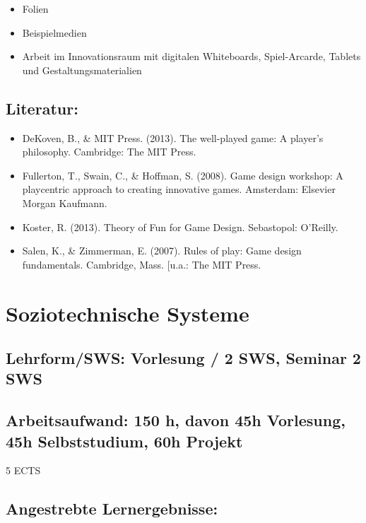 \begin{itemize}
\tightlist
\item
  Folien
\item
  Beispielmedien
\item
  Arbeit im Innovationsraum mit digitalen Whiteboards, Spiel-Arcarde,
  Tablets und Gestaltungsmaterialien
\end{itemize}

\section{Literatur:}\label{literatur-23}

\begin{itemize}
\tightlist
\item
  DeKoven, B., \& MIT Press. (2013). The well-played game: A player's
  philosophy. Cambridge: The MIT Press.
\item
  Fullerton, T., Swain, C., \& Hoffman, S. (2008). Game design workshop:
  A playcentric approach to creating innovative games. Amsterdam:
  Elsevier Morgan Kaufmann.
\item
  Koster, R. (2013). Theory of Fun for Game Design. Sebastopol:
  O'Reilly.
\item
  Salen, K., \& Zimmerman, E. (2007). Rules of play: Game design
  fundamentals. Cambridge, Mass. {[}u.a.: The MIT Press.
\end{itemize}

\chapter{Soziotechnische Systeme}\label{soziotechnische-systeme}

\section{Lehrform/SWS: Vorlesung / 2 SWS, Seminar 2
SWS}\label{lehrformsws-vorlesung-2-sws-seminar-2-sws-1}

\section{Arbeitsaufwand: 150 h, davon 45h Vorlesung, 45h
Selbststudium, 60h
Projekt}\label{arbeitsaufwand-150-h-davon-45h-vorlesung-45h-selbststudium-60h-projekt}

5 ECTS

\section{Angestrebte
Lernergebnisse:}\label{angestrebte-lernergebnisse-24}

